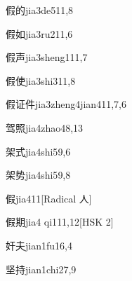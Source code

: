 \begin{entry}{假的}{jia3de5}{11,8}
\end{entry}

\begin{entry}{假如}{jia3ru2}{11,6}
\end{entry}

\begin{entry}{假声}{jia3sheng1}{11,7}
\end{entry}

\begin{entry}{假使}{jia3shi3}{11,8}
\end{entry}

\begin{entry}{假证件}{jia3zheng4jian4}{11,7,6}
\end{entry}

\begin{entry}{驾照}{jia4zhao4}{8,13}
\end{entry}

\begin{entry}{架式}{jia4shi5}{9,6}
\end{entry}

\begin{entry}{架势}{jia4shi5}{9,8}
\end{entry}

\begin{entry}{假}{jia4}{11}[Radical 人]
\end{entry}

\begin{entry}{假期}{jia4 qi1}{11,12}[HSK 2]
\end{entry}

\begin{entry}{奸夫}{jian1fu1}{6,4}
\end{entry}

\begin{entry}{坚持}{jian1chi2}{7,9}
\end{entry}

